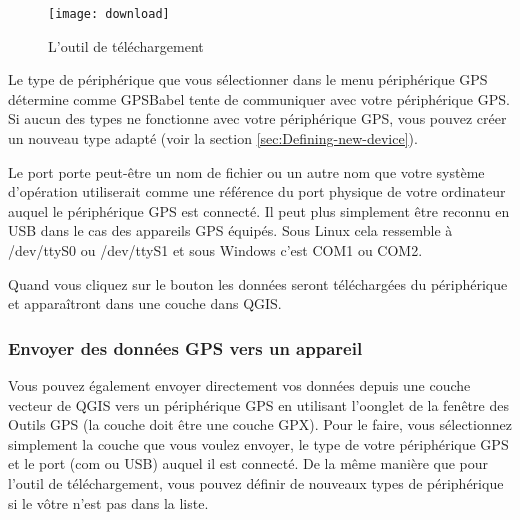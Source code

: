 \begin{figure}[ht]
   \begin{center}
\caption{\label{figure_download}L'outil de téléchargement \nixcaption}
\texttt{[image: download]}
   \end{center}
\end{figure}

Le type de périphérique que vous sélectionner dans le menu périphérique GPS détermine comme GPSBabel tente de communiquer avec votre périphérique GPS.
Si aucun des types ne fonctionne avec votre périphérique GPS, vous pouvez créer un nouveau type adapté (voir la section \ref{sec:Defining-new-device}).

Le port porte peut-être un nom de fichier ou un autre nom que votre système d'opération utiliserait comme une référence du port physique de votre ordinateur auquel le périphérique GPS est connecté. Il peut plus simplement être reconnu en USB dans le cas des appareils GPS équipés.
\nix Sous Linux cela ressemble à /dev/ttyS0 ou /dev/ttyS1  et sous \win Windows c'est COM1 ou COM2.

Quand vous cliquez sur le bouton  les données seront téléchargées du périphérique et apparaîtront dans une couche dans QGIS.

\subsubsection{Envoyer des données GPS vers un appareil}

Vous pouvez également envoyer directement vos données depuis une couche vecteur de QGIS vers un périphérique GPS en utilisant l'oonglet  de la fenêtre des Outils GPS (la couche doit être une couche GPX). Pour le faire, vous sélectionnez simplement la couche que vous voulez envoyer, le type de votre périphérique GPS et le port (com ou USB) auquel il est connecté.
De la même manière que pour l'outil de téléchargement, vous pouvez définir de nouveaux types de périphérique si le vôtre n'est pas dans la liste.

